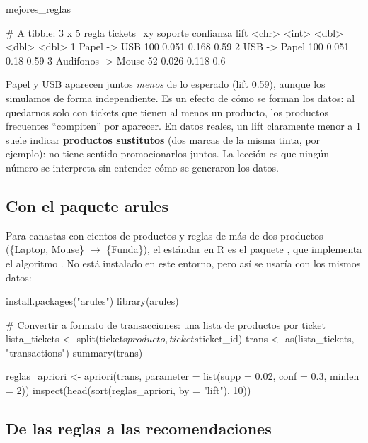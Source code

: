 \begin{rcode}
mejores_reglas %
\end{rcode}

\begin{rsalida}
# A tibble: 3 x 5
  regla              tickets_xy soporte confianza  lift
  <chr>                   <int>   <dbl>     <dbl> <dbl>
1 Papel -> USB              100   0.051     0.168  0.59
2 USB -> Papel              100   0.051     0.18   0.59
3 Audifonos -> Mouse         52   0.026     0.118  0.6 
\end{rsalida}

Papel y USB aparecen juntos \emph{menos} de lo esperado (lift 0.59), aunque
los simulamos de forma independiente. Es un efecto de cómo se forman los datos:
al quedarnos solo con tickets que tienen al menos un producto, los productos
frecuentes ``compiten'' por aparecer. En datos reales, un lift claramente
menor a 1 suele indicar \textbf{productos sustitutos} (dos marcas de la misma
tinta, por ejemplo): no tiene sentido promocionarlos juntos. La lección es que
ningún número se interpreta sin entender cómo se generaron los datos.

\subsection{Con el paquete arules}

Para canastas con cientos de productos y reglas de más de dos productos
(\{Laptop, Mouse\} $\rightarrow$ \{Funda\}), el estándar en R es el paquete
, que implementa el algoritmo . No está
instalado en este entorno, pero así se usaría con los mismos datos:

\begin{rnoejecutar}
install.packages("arules")
library(arules)

# Convertir a formato de transacciones: una lista de productos por ticket
lista_tickets <- split(tickets$producto, tickets$ticket_id)
trans <- as(lista_tickets, "transactions")
summary(trans)

reglas_apriori <- apriori(trans,
                          parameter = list(supp = 0.02, conf = 0.3,
                                           minlen = 2))
inspect(head(sort(reglas_apriori, by = "lift"), 10))
\end{rnoejecutar}

\subsection{De las reglas a las recomendaciones}

